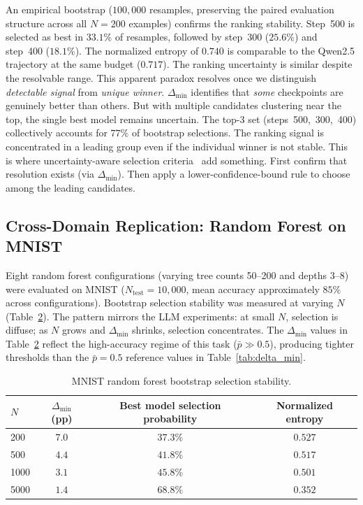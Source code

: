 \documentclass[pdflatex,sn-mathphys-ay,iicol]{sn-jnl}
\theoremstyle{thmstylethree}
\begin{document}
\begin{table}[t]
An empirical bootstrap ($100{,}000$ resamples, preserving the paired evaluation structure across all $N=200$ examples) confirms the ranking stability. Step~500 is selected as best in $33.1\%$ of resamples, followed by step~300 ($25.6\%$) and step~400 ($18.1\%$). The normalized entropy of $0.740$ is comparable to the Qwen2.5 trajectory at the same budget ($0.717$). The ranking uncertainty is similar despite the resolvable range. This apparent paradox resolves once we distinguish \emph{detectable signal} from \emph{unique winner}. $\Delta_{\min}$ identifies that \emph{some} checkpoints are genuinely better than others. But with multiple candidates clustering near the top, the single best model remains uncertain. The top-3 set (steps~500,~300,~400) collectively accounts for $77\%$ of bootstrap selections. The ranking signal is concentrated in a leading group even if the individual winner is not stable. This is where uncertainty-aware selection criteria~\citep{du2026stability} add something. First confirm that resolution exists (via $\Delta_{\min}$). Then apply a lower-confidence-bound rule to choose among the leading candidates.

\subsection{Cross-Domain Replication: Random Forest on MNIST}\label{sec:mnist}

Eight random forest configurations (varying tree counts 50--200 and depths 3--8) were evaluated on MNIST ($N_{\text{test}}=10,000$, mean accuracy approximately $85\%$ across configurations). Bootstrap selection stability was measured at varying $N$ (Table~\ref{tab:mnist}). The pattern mirrors the LLM experiments: at small $N$, selection is diffuse; as $N$ grows and $\Delta_{\min}$ shrinks, selection concentrates. The $\Delta_{\min}$ values in Table~\ref{tab:mnist} reflect the high-accuracy regime of this task ($\bar{p}\gg0.5$), producing tighter thresholds than the $\bar{p}=0.5$ reference values in Table~\ref{tab:delta_min}.

\begin{table}[t]
\centering
\small
\caption{MNIST random forest bootstrap selection stability.}
\label{tab:mnist}
\begin{tabular}{lccc}\toprule
$N$ & $\Delta_{\min}$ (pp) & Best model selection probability & Normalized entropy \\\midrule
200  & $7.0$ & $37.3\%$ & $0.527$ \\
500  & $4.4$ & $41.8\%$ & $0.517$ \\
1000 & $3.1$ & $45.8\%$ & $0.501$ \\
5000 & $1.4$ & $68.8\%$ & $0.352$ \\\bottomrule
\end{tabular}
\end{table}


\end{table}
\end{document}
